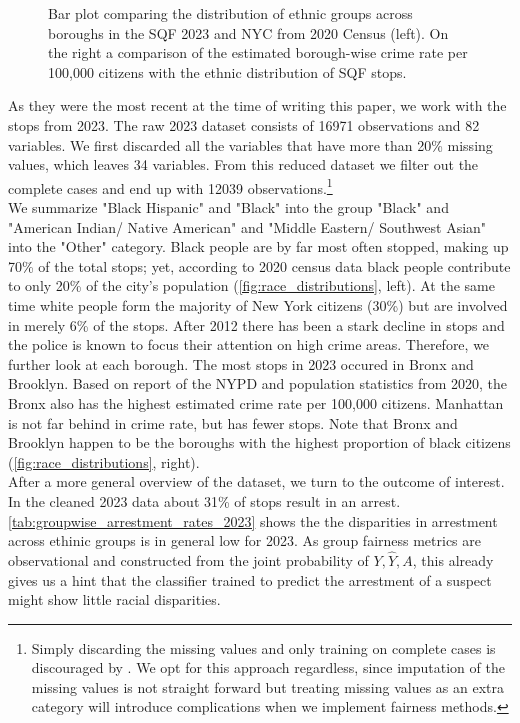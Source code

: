 \begin{figure}
\begin{minipage}{0.49\textwidth}
  \end{minipage}
  \caption{Bar plot comparing the distribution of ethnic groups across boroughs in the SQF 2023 and NYC from 2020 Census (left). On the right a comparison of the estimated borough-wise crime rate per 100,000 citizens with the ethnic distribution of SQF stops.}
  \label{fig:race_distributions}
\end{figure}

As they were the most recent at the time of writing this paper, we work with the stops from 2023. The raw 2023 dataset consists of 16971 observations and 82 variables. We first discarded all the variables that have more than 20\% missing values, which leaves 34 variables.
From this reduced dataset we filter out the complete cases and end up with 12039 observations.\footnote{Simply discarding the missing values and only training on complete cases is discouraged by \cite{fernando2021}. We opt for this approach regardless, since imputation of the missing values is not straight forward
but treating missing values as an extra category will introduce complications when we implement fairness methods.}\\

We summarize "Black Hispanic" and "Black" into the group "Black" and  "American Indian/ Native American" and "Middle Eastern/ Southwest Asian" into the "Other" category. Black people are by far most often stopped, making up 70\% of the total stops; yet, according to 2020 census data black people contribute to only 20\% of the city's population (\autoref{fig:race_distributions}, left). At the same time white people form the majority of New York citizens (30\%) but are involved in merely 6\% of the stops. 
After 2012 there has been a stark decline in stops and the police is known to focus their attention on high crime areas. Therefore, we further look at each borough. 
The most stops in 2023 occured in Bronx and Brooklyn. Based on report of the NYPD and population statistics from 2020, the Bronx also has the highest estimated crime rate per 100,000 citizens. Manhattan is not far behind in crime rate, but has fewer stops. Note that Bronx and Brooklyn happen to be the boroughs with the highest proportion of black citizens (\autoref{fig:race_distributions}, right).\\

After a more general overview of the dataset, we turn to the outcome of interest. In the cleaned 2023 data about 31\% of stops result in an arrest.
\autoref{tab:groupwise_arrestment_rates_2023} shows the the disparities in arrestment across ethinic groups is in general low for 2023.
As group fairness metrics are observational and constructed from the joint probability of $Y, \hat{Y}, A$, this already gives us a hint that the classifier trained to predict the arrestment of a suspect might show little racial disparities.

